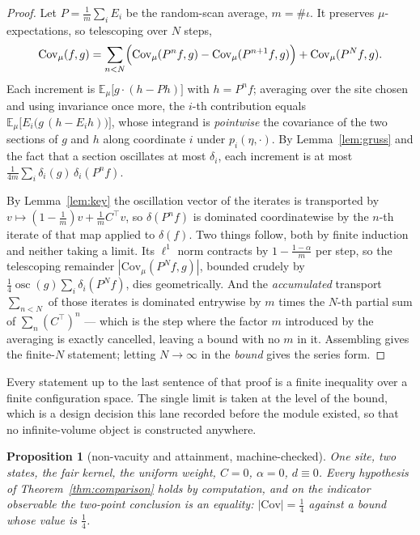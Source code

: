 \documentclass[11pt]{article}
\newtheorem{proposition}[theorem]{Proposition}
\theoremstyle{definition}
\begin{document}
\begin{proof}
Let $P=\frac1m\sum_iE_i$ be the random-scan average, $m=\#\iota$.  It preserves
$\mu$-expectations, so telescoping over $N$ steps,
\[
  \mathrm{Cov}_\mu(f,g)=\sum_{n<N}\Bigl(\mathrm{Cov}_\mu(P^nf,g)
  -\mathrm{Cov}_\mu(P^{n+1}f,g)\Bigr)+\mathrm{Cov}_\mu(P^Nf,g).
\]
Each increment is $\mathbb{E}_\mu\bigl[g\cdot(h-Ph)\bigr]$ with $h=P^nf$;
averaging over the site chosen and using invariance once more, the
$i$\nobreakdash-th contribution equals $\mathbb{E}_\mu\bigl[E_i\bigl(g\,(h-E_i
h)\bigr)\bigr]$, whose integrand is \emph{pointwise} the covariance of the two
sections of $g$ and $h$ along coordinate $i$ under $p_i(\eta,\cdot)$.  By
Lemma~\ref{lem:gruss} and the fact that a section oscillates at most
$\delta_i$, each increment is at most
$\frac{1}{4m}\sum_i\delta_i(g)\,\delta_i(P^nf)$.

By Lemma~\ref{lem:key} the oscillation vector of the iterates is transported by
$v\mapsto(1-\frac1m)v+\frac1m C^{\!\top}v$, so $\delta(P^nf)$ is dominated
coordinatewise by the $n$-th iterate of that map applied to $\delta(f)$.  Two
things follow, both by finite induction and neither taking a limit.  Its
$\ell^1$ norm contracts by $1-\frac{1-\alpha}{m}$ per step, so the telescoping
remainder $|\mathrm{Cov}_\mu(P^Nf,g)|$, bounded crudely by
$\frac14\operatorname{osc}(g)\sum_i\delta_i(P^Nf)$, dies geometrically.  And the
\emph{accumulated} transport $\sum_{n<N}$ of those iterates is dominated
entrywise by $m$ times the $N$-th partial sum of $\sum_n(C^{\!\top})^n$ ---
which is the step where the factor $m$ introduced by the averaging is exactly
cancelled, leaving a bound with no $m$ in it.  Assembling gives the finite-$N$
statement; letting $N\to\infty$ in the \emph{bound} gives the series form.
\end{proof}

Every statement up to the last sentence of that proof is a finite inequality
over a finite configuration space.  The single limit is taken at the level of
the bound, which is a design decision this lane recorded before the module
existed, so that no infinite-volume object is constructed anywhere.

\begin{proposition}[non-vacuity and attainment, machine-checked]
\label{prop:comparison-witness}
One site, two states, the fair kernel, the uniform weight, $C=0$, $\alpha=0$,
$d\equiv0$.  Every hypothesis of Theorem~\ref{thm:comparison} holds by
computation, and on the indicator observable the two-point conclusion is an
\emph{equality}: $|\mathrm{Cov}|=\tfrac14$ against a bound whose value is
$\tfrac14$.
\end{proposition}
\end{document}
